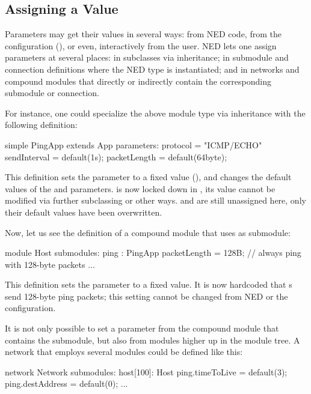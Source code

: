 \subsection{Assigning a Value}
\label{sec:ned-lang:parameter-assignments}

Parameters may get their values in several ways: from NED code, from the
configuration (), or even, interactively from the
user. NED lets one assign parameters at several places: in subclasses via
inheritance; in submodule and connection definitions where the NED type is
instantiated; and in networks and compound modules that directly or
indirectly contain the corresponding submodule or connection.

For instance, one could specialize the above  module type via
inheritance with the following definition:

\begin{ned}
simple PingApp extends App
{
    parameters:
        protocol = "ICMP/ECHO"
        sendInterval = default(1s);
        packetLength = default(64byte);
}
\end{ned}

This definition sets the  parameter to a fixed value
(), and changes the default values of the
 and  parameters.  is now
locked down in , its value cannot be modified via further subclassing
or other ways.  and  are still unassigned
here, only their default values have been overwritten.

Now, let us see the definition of a  compound module that uses
 as submodule:

\begin{ned}
module Host
{
    submodules:
        ping : PingApp {
            packetLength = 128B; // always ping with 128-byte packets
        }
        ...
}
\end{ned}

This definition sets the  parameter to a fixed value. It
is now hardcoded that s send 128-byte ping packets; this
setting cannot be changed from NED or the configuration.

It is not only possible to set a parameter from the compound module that
contains the submodule, but also from modules higher up in the module tree.
A network that employs several  modules could be defined like
this:

\begin{ned}
network Network
{
    submodules:
        host[100]: Host {
            ping.timeToLive = default(3);
            ping.destAddress = default(0);
        }
        ...
}
\end{ned}

